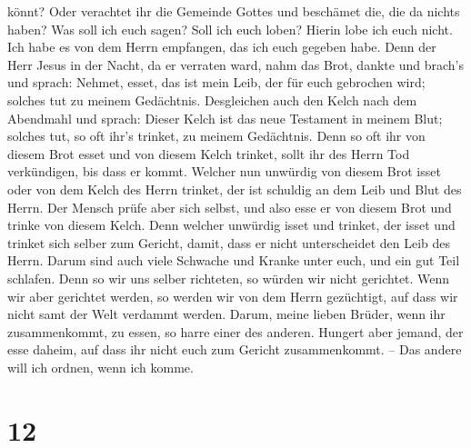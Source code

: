 könnt? Oder verachtet ihr die Gemeinde Gottes und beschämet die, die da
nichts haben? Was soll ich euch sagen? Soll ich euch loben? Hierin lobe
ich euch nicht.  Ich habe es von dem Herrn empfangen, das
ich euch gegeben habe. Denn der Herr Jesus in der Nacht, da er verraten
ward, nahm das Brot,  dankte und brach's und sprach:
Nehmet, esset, das ist mein Leib, der für euch gebrochen wird; solches
tut zu meinem Gedächtnis.  Desgleichen auch den Kelch
nach dem Abendmahl und sprach: Dieser Kelch ist das neue Testament in
meinem Blut; solches tut, so oft ihr's trinket, zu meinem Gedächtnis.
 Denn so oft ihr von diesem Brot esset und von diesem
Kelch trinket, sollt ihr des Herrn Tod verkündigen, bis dass er kommt.
 Welcher nun unwürdig von diesem Brot isset oder von dem
Kelch des Herrn trinket, der ist schuldig an dem Leib und Blut des
Herrn.  Der Mensch prüfe aber sich selbst, und also esse
er von diesem Brot und trinke von diesem Kelch.  Denn
welcher unwürdig isset und trinket, der isset und trinket sich selber
zum Gericht, damit, dass er nicht unterscheidet den Leib des Herrn.
 Darum sind auch viele Schwache und Kranke unter euch,
und ein gut Teil schlafen.  Denn so wir uns selber
richteten, so würden wir nicht gerichtet.  Wenn wir aber
gerichtet werden, so werden wir von dem Herrn gezüchtigt, auf dass wir
nicht samt der Welt verdammt werden.  Darum, meine lieben
Brüder, wenn ihr zusammenkommt, zu essen, so harre einer des anderen.
 Hungert aber jemand, der esse daheim, auf dass ihr nicht
euch zum Gericht zusammenkommt. -- Das andere will ich ordnen, wenn ich
komme.

\hypertarget{section-11}{%
\section{12}\label{section-11}}

